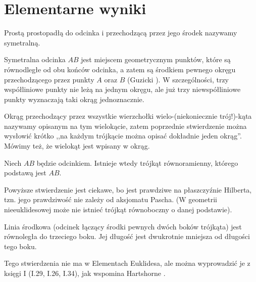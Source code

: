 \section{Elementarne wyniki}

\begin{definition}[symetralna]
    \label{def_symetralna}
	Prostą prostopadłą do odcinka i przechodzącą przez jego środek nazywamy symetralną.
\end{definition}

Symetralna odcinka $AB$ jest miejscem geometrycznym punktów, które są równodległe od obu końców odcinka, a zatem są środkiem pewnego okręgu przechodzącego przez punkty $A$ oraz $B$ (Guzicki \cite[s. 14, 15]{guzicki_2021}).
W szczególności, trzy współliniowe punkty nie leżą na jednym okręgu, ale już trzy niewspółliniowe punkty wyznaczają taki okrąg jednoznacznie.

Okrąg przechodzący przez wszystkie wierzchołki wielo-(niekoniecznie trój!)-kąta nazywamy opisanym na tym wielokącie, zatem poprzednie stwierdzenie można wysłowić krótko ,,na każdym trójkącie można opisać dokładnie jeden okrąg''.
Mówimy też, że wielokąt jest wpisany w okrąg.
%


\begin{proposition}
	\label{hartshorne_52x}
    Niech $AB$ będzie odcinkiem.
	Istnieje wtedy trójkąt równoramienny, którego podstawą jest $AB$.
\end{proposition}

Powyższe stwierdzenie jest ciekawe, bo jest prawdziwe na płaszczyźnie Hilberta, tzn. jego prawdziwość nie zależy od aksjomatu Pascha.
(W geometrii nieeuklidesowej może nie istnieć trójkąt równoboczny o danej podstawie).

\begin{proposition}
	\label{hartshorne_52}
	Linia środkowa (odcinek łączący środki pewnych dwóch boków trójkąta) jest równoległa do trzeciego boku.
    Jej długość jest dwukrotnie mniejsza od długości tego boku.
\end{proposition}

Tego stwierdzenia nie ma w Elementach Euklidesa, ale można wyprowadzić je z księgi I (I.29, I.26, I.34), jak wspomina Hartshorne \cite[s. 45, 52. 53]{hartshorne2000}.


